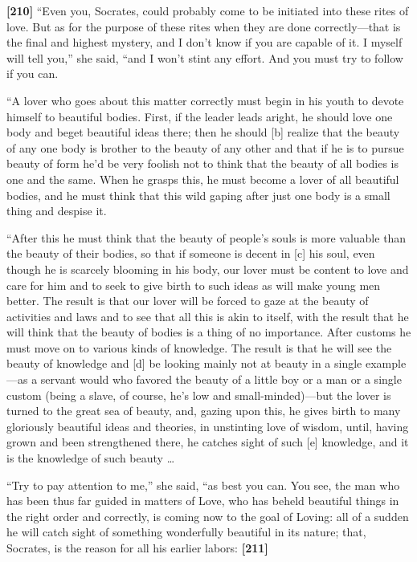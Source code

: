 {\bf {[}210{]}} “Even you, Socrates, could probably come to be initiated
into these rites of love. But as for the purpose of these rites when
they are done correctly---that is the final and highest mystery, and I
don't know if you are capable of it. I myself will tell you,” she said,
“and I won't stint any effort. And you must try to follow if you can.

“A lover who goes about this matter correctly must begin in his youth to
devote himself to beautiful bodies. First, if the
leader leads aright,
he should love one body and beget beautiful ideas there; then he should
{[}b{]} realize that the beauty of any one body is brother to the beauty
of any other and that if he is to pursue beauty of form he'd be very
foolish not to think that the beauty of all bodies is one and the same.
When he grasps this, he must become a lover of all beautiful bodies, and
he must think that this wild gaping after just one body is a small thing
and despise it.

“After this he must think that the beauty of people's souls is more
valuable than the beauty of their bodies, so that if someone is decent
in {[}c{]} his soul, even though he is scarcely blooming in his body,
our lover must be content to love and care for him and to seek to give
birth to such ideas as will make young men better. The result is that
our lover will be forced to gaze at the beauty of activities and laws
and to see that all this is akin to itself, with the result that he will
think that the beauty of bodies is a thing of no importance. After
customs he must move on to various kinds of knowledge. The result is
that he will see the beauty of knowledge and {[}d{]} be looking mainly
not at beauty in a single example---as a servant would who favored the
beauty of a little boy or a man or a single custom (being a slave, of
course, he's low and small-minded)---but the lover is turned to the
great sea of beauty, and, gazing upon this, he gives birth to many
gloriously beautiful ideas and theories, in unstinting love of
wisdom, until, having
grown and been strengthened there, he catches sight of such {[}e{]}
knowledge, and it is the knowledge of such beauty \ldots{}

“Try to pay attention to me,” she said, “as best you can. You see, the
man who has been thus far guided in matters of Love, who has beheld
beautiful things in the right order and correctly, is coming now to the
goal of Loving: all of a sudden he will catch sight of something
wonderfully beautiful in its nature; that, Socrates, is the reason for
all his earlier labors: {\bf {[}211{]}}

